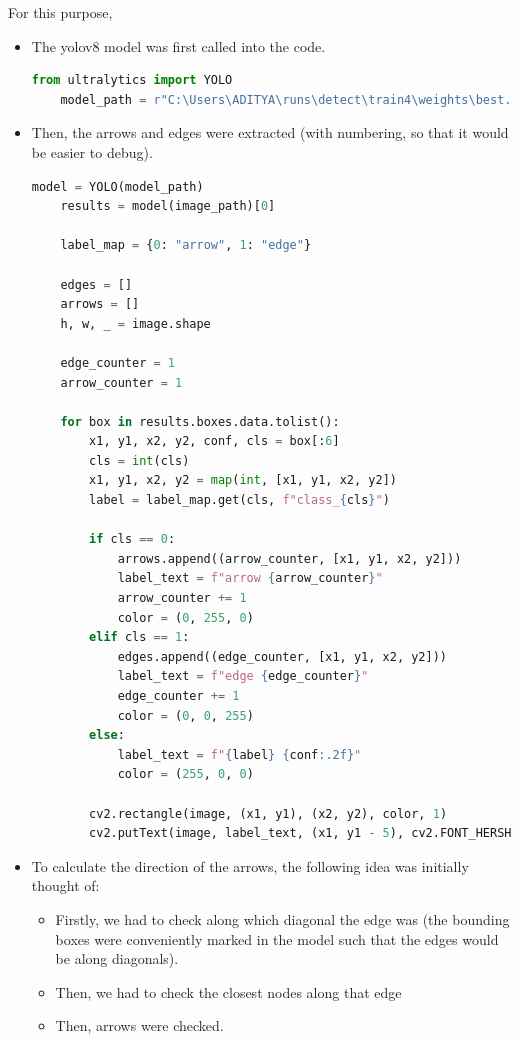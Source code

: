 \documentclass{article}
\begin{document}
For this purpose, 
\begin{itemize}
    \item The yolov8 model was first called into the code.
    \begin{lstlisting}[language=Python, caption=Calling the model]
    from ultralytics import YOLO
    model_path = r"C:\Users\ADITYA\runs\detect\train4\weights\best.pt"
    \end{lstlisting}
    \item Then, the arrows and edges were extracted (with numbering, so that it would be easier to debug).
    \begin{lstlisting}[language=Python, caption=Gathering the arrows and edges. The graph was outputted in order to check for possible issues and their cause.]
    model = YOLO(model_path)
    results = model(image_path)[0]

    label_map = {0: "arrow", 1: "edge"}

    edges = []
    arrows = []
    h, w, _ = image.shape
    
    edge_counter = 1
    arrow_counter = 1
    
    for box in results.boxes.data.tolist():
        x1, y1, x2, y2, conf, cls = box[:6]
        cls = int(cls)
        x1, y1, x2, y2 = map(int, [x1, y1, x2, y2])
        label = label_map.get(cls, f"class_{cls}")
    
        if cls == 0:
            arrows.append((arrow_counter, [x1, y1, x2, y2]))
            label_text = f"arrow {arrow_counter}"
            arrow_counter += 1
            color = (0, 255, 0)
        elif cls == 1:
            edges.append((edge_counter, [x1, y1, x2, y2]))
            label_text = f"edge {edge_counter}"
            edge_counter += 1
            color = (0, 0, 255)
        else:
            label_text = f"{label} {conf:.2f}"
            color = (255, 0, 0)
    
        cv2.rectangle(image, (x1, y1), (x2, y2), color, 1)
        cv2.putText(image, label_text, (x1, y1 - 5), cv2.FONT_HERSHEY_SIMPLEX, 0.5, color, 1)
    \end{lstlisting}
    \item To calculate the direction of the arrows, the following idea was initially thought of:
    \begin{itemize}
        \item Firstly, we had to check along which diagonal the edge was (the bounding boxes were conveniently marked in the model such that the edges would be along diagonals).
        \item Then, we had to check the closest nodes along that edge
        \item Then, arrows were checked.
    \end{itemize}    
\end{itemize}
\end{document}
